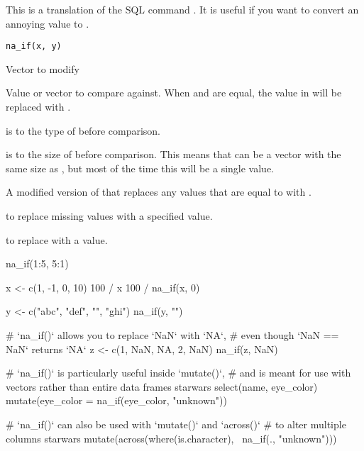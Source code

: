 \documentclass[a4paper]{book}
\begin{document}
%
\begin{Description}
This is a translation of the SQL command . It is useful if you want
to convert an annoying value to .
\end{Description}
%
\begin{Usage}
\begin{verbatim}
na_if(x, y)
\end{verbatim}
\end{Usage}
%
\begin{Arguments}
\begin{ldescription}
\item[\code{x}] Vector to modify

\item[\code{y}] Value or vector to compare against. When  and  are equal, the
value in  will be replaced with .

 is  to the type of  before
comparison.

 is  to the size of  before
comparison. This means that  can be a vector with the same size as ,
but most of the time this will be a single value.
\end{ldescription}
\end{Arguments}
%
\begin{Value}
A modified version of  that replaces any values that
are equal to  with .
\end{Value}
%
\begin{SeeAlso}
 to replace missing values with a specified
value.

 to replace  with a value.
\end{SeeAlso}
%
\begin{Examples}
\begin{ExampleCode}
na_if(1:5, 5:1)

x <- c(1, -1, 0, 10)
100 / x
100 / na_if(x, 0)

y <- c("abc", "def", "", "ghi")
na_if(y, "")

# `na_if()` allows you to replace `NaN` with `NA`,
# even though `NaN == NaN` returns `NA`
z <- c(1, NaN, NA, 2, NaN)
na_if(z, NaN)

# `na_if()` is particularly useful inside `mutate()`,
# and is meant for use with vectors rather than entire data frames
starwars %
  select(name, eye_color) %
  mutate(eye_color = na_if(eye_color, "unknown"))

# `na_if()` can also be used with `mutate()` and `across()`
# to alter multiple columns
starwars %
   mutate(across(where(is.character), ~na_if(., "unknown")))
\end{ExampleCode}
\end{Examples}
\end{document}
